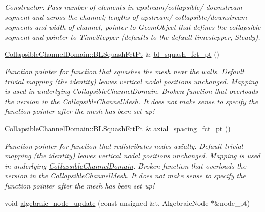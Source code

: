 \begin{DoxyCompactItemize}
\begin{DoxyCompactList}\small\item\em Constructor\+: Pass number of elements in upstream/collapsible/ downstream segment and across the channel; lengths of upstream/ collapsible/downstream segments and width of channel, pointer to Geom\+Object that defines the collapsible segment and pointer to Time\+Stepper (defaults to the default timestepper, Steady). \end{DoxyCompactList}\item 
\hyperlink{classoomph_1_1CollapsibleChannelDomain_a2bf1d7943bfac134a5c27a54c7e1faed}{Collapsible\+Channel\+Domain\+::\+B\+L\+Squash\+Fct\+Pt} \& \hyperlink{classoomph_1_1AlgebraicCollapsibleChannelMesh_abf1848b49f57419af4379a637464587d}{bl\+\_\+squash\+\_\+fct\+\_\+pt} ()
\begin{DoxyCompactList}\small\item\em Function pointer for function that squashes the mesh near the walls. Default trivial mapping (the identity) leaves vertical nodal positions unchanged. Mapping is used in underlying \hyperlink{classoomph_1_1CollapsibleChannelDomain}{Collapsible\+Channel\+Domain}. Broken function that overloads the version in the \hyperlink{classoomph_1_1CollapsibleChannelMesh}{Collapsible\+Channel\+Mesh}. It does not make sense to specify the function pointer after the mesh has been set up! \end{DoxyCompactList}\item 
\hyperlink{classoomph_1_1CollapsibleChannelDomain_a2bf1d7943bfac134a5c27a54c7e1faed}{Collapsible\+Channel\+Domain\+::\+B\+L\+Squash\+Fct\+Pt} \& \hyperlink{classoomph_1_1AlgebraicCollapsibleChannelMesh_afa53bd526ff0903526afbdf5e6f4f532}{axial\+\_\+spacing\+\_\+fct\+\_\+pt} ()
\begin{DoxyCompactList}\small\item\em Function pointer for function that redistributes nodes axially. Default trivial mapping (the identity) leaves vertical nodal positions unchanged. Mapping is used in underlying \hyperlink{classoomph_1_1CollapsibleChannelDomain}{Collapsible\+Channel\+Domain}. Broken function that overloads the version in the \hyperlink{classoomph_1_1CollapsibleChannelMesh}{Collapsible\+Channel\+Mesh}. It does not make sense to specify the function pointer after the mesh has been set up! \end{DoxyCompactList}\item 
void \hyperlink{classoomph_1_1AlgebraicCollapsibleChannelMesh_ae1ea6d9baa12e2ca87d21d4370f41870}{algebraic\+\_\+node\+\_\+update} (const unsigned \&t, Algebraic\+Node $\ast$\&node\+\_\+pt)

\end{DoxyCompactItemize}
